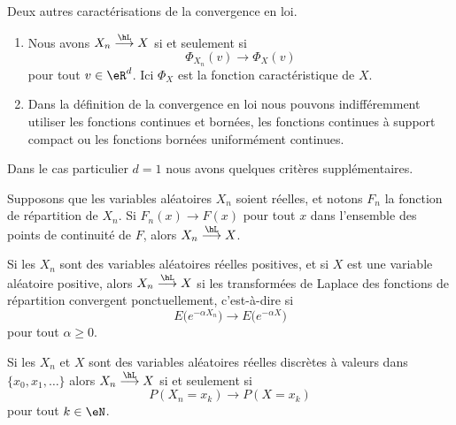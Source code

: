 \begin{proposition}     \label{PrpopCaractCvL}
	Deux autres caractérisations de la convergence en loi.
	\begin{enumerate}
		\item
		      Nous avons \( X_n\stackrel{\hL}{\longrightarrow}X\) si et seulement si
		      \begin{equation}
			      \Phi_{X_n}(v)\to\Phi_X(v)
		      \end{equation}
		      pour tout \( v\in\eR^d\). Ici \( \Phi_X\) est la fonction caractéristique de \( X\).
		\item
		      Dans la définition de la convergence en loi nous pouvons indifféremment utiliser les fonctions continues et bornées, les fonctions continues à support compact ou les fonctions bornées uniformément continues.
	\end{enumerate}
\end{proposition}


Dans le cas particulier \( d=1\) nous avons quelques critères supplémentaires.

\begin{proposition}     \label{PropoFnrepCvL}
	Supposons que les variables aléatoires \( X_n\) soient réelles, et notons \( F_n\) la fonction de répartition de \( X_n\). Si \( F_n(x)\to F(x)\) pour tout \( x\) dans l'ensemble des points de continuité de \( F\), alors \( X_n\stackrel{\hL}{\longrightarrow}X\).
\end{proposition}

\begin{proposition}		\label{PROPooNRQJooXoCcbZ}
	Si les \( X_n\) sont des variables aléatoires réelles positives, et si \( X\) est une variable aléatoire positive, alors \( X_n\stackrel{\hL}{\longrightarrow}X\) si les transformées de Laplace des fonctions de répartition convergent ponctuellement, c'est-à-dire si
	\begin{equation}
		E\big(  e^{-\alpha X_n} \big)\to E\big(  e^{-\alpha X} \big)
	\end{equation}
	pour tout \( \alpha\geq 0\).
\end{proposition}

\begin{proposition}		\label{PROPooZMHKooLwCwqs}
	Si les \( X_n\) et \( X\) sont des variables aléatoires réelles discrètes à valeurs dans \( \{ x_0,x_1,\ldots \}\) alors \( X_n\stackrel{\hL}{\longrightarrow} X\) si et seulement si
	\begin{equation}
		P(X_n=x_k)\to P(X=x_k)
	\end{equation}
	pour tout \( k\in\eN\).
\end{proposition}

